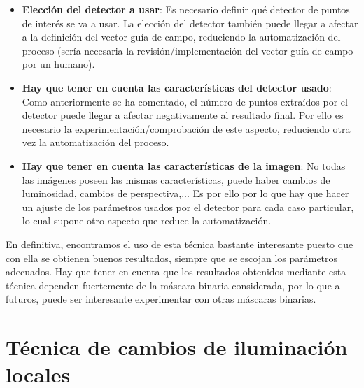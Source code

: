 \documentclass[11pt,twoside,titlepage,a4paper]{article}
\numberwithin{equation}{section} %
\theoremstyle{usual}
\begin{document}
\begin{itemize}
    \item \textbf{Elección del detector a usar}: Es necesario definir qué detector de puntos de interés se va a usar. La elección del detector también puede llegar a afectar a la definición del vector guía de campo, reduciendo la automatización del proceso (sería necesaria la revisión/implementación del vector guía de campo por un humano).
    \item \textbf{Hay que tener en cuenta las características del detector usado}: Como anteriormente se ha comentado, el número de puntos extraídos por el detector puede llegar a afectar negativamente al resultado final. Por ello es necesario la experimentación/comprobación de este aspecto, reduciendo otra vez la automatización del proceso.
    \item \textbf{Hay que tener en cuenta las características de la imagen}: No todas las imágenes poseen las mismas características, puede haber cambios de luminosidad, cambios de perspectiva,... Es por ello por lo que hay que hacer un ajuste de los parámetros usados por el detector para cada caso particular, lo cual supone otro aspecto que reduce la automatización.
\end{itemize}

En definitiva, encontramos el uso de esta técnica bastante interesante puesto que con ella se obtienen buenos resultados, siempre que se escojan los parámetros adecuados. Hay que tener en cuenta que los resultados obtenidos mediante esta técnica dependen fuertemente de la máscara binaria considerada, por lo que a futuros, puede ser interesante experimentar con otras máscaras binarias.

\newpage

\section{Técnica de cambios de iluminación locales}
\end{document}
